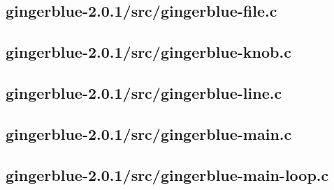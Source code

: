 \documentclass[UKenglish]{ifimaster}  %
\begin{document}
\begin{scriptsize}
  
  
  
\end{scriptsize}

\subsection{gingerblue-2.0.1/src/gingerblue-file.c}

\begin{scriptsize}
  
  
  
\end{scriptsize}

\subsection{gingerblue-2.0.1/src/gingerblue-knob.c}

\begin{scriptsize}
  
  
  
\end{scriptsize}

\subsection{gingerblue-2.0.1/src/gingerblue-line.c}

\begin{scriptsize}
  
  
  
\end{scriptsize}

\subsection{gingerblue-2.0.1/src/gingerblue-main.c}

\begin{scriptsize}
  
  
  
\end{scriptsize}

\subsection{gingerblue-2.0.1/src/gingerblue-main-loop.c}
\end{document}
